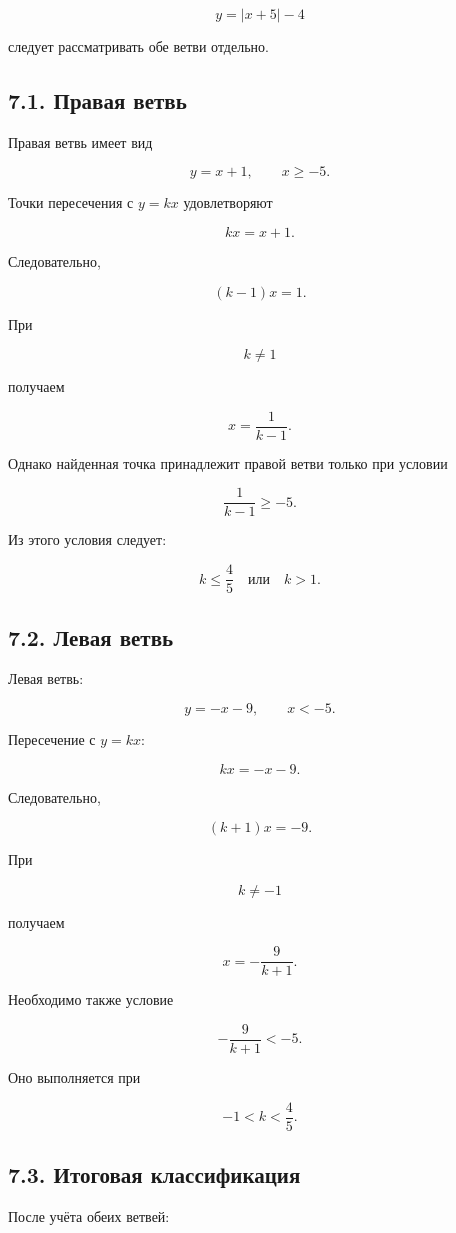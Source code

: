 \documentclass[a4paper,12pt]{article}
\begin{document}
\[
y=|x+5|-4
\]

следует рассматривать обе ветви отдельно.

\subsection*{7.1. Правая ветвь}

Правая ветвь имеет вид

\[
y=x+1,
\qquad x\ge-5.
\]

Точки пересечения с \(y=kx\) удовлетворяют

\[
kx=x+1.
\]

Следовательно,

\[
(k-1)x=1.
\]

При

\[
k\ne1
\]

получаем

\[
x=\frac{1}{k-1}.
\]

Однако найденная точка принадлежит правой ветви
только при условии

\[
\frac{1}{k-1}\ge-5.
\]

Из этого условия следует:

\[
k\le\frac45
\quad\text{или}\quad
k>1.
\]

\subsection*{7.2. Левая ветвь}

Левая ветвь:

\[
y=-x-9,
\qquad x<-5.
\]

Пересечение с \(y=kx\):

\[
kx=-x-9.
\]

Следовательно,

\[
(k+1)x=-9.
\]

При

\[
k\ne-1
\]

получаем

\[
x=-\frac{9}{k+1}.
\]

Необходимо также условие

\[
-\frac{9}{k+1}<-5.
\]

Оно выполняется при

\[
-1<k<\frac45.
\]

\subsection*{7.3. Итоговая классификация}

После учёта обеих ветвей:
\end{document}

